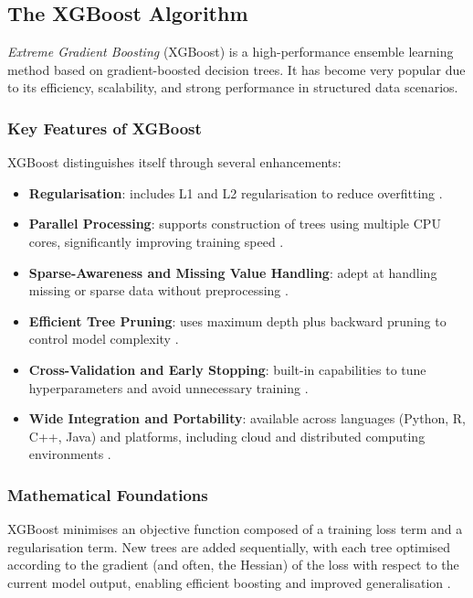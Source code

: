\subsection{The XGBoost Algorithm}

\emph{Extreme Gradient Boosting} (XGBoost) is a high-performance ensemble learning method based on gradient-boosted decision trees. It has become very popular due to its efficiency, scalability, and strong performance in structured data scenarios.

\subsubsection{Key Features of XGBoost}

XGBoost distinguishes itself through several enhancements:

\begin{itemize}
  \item \textbf{Regularisation}: includes L1 and L2 regularisation to reduce overfitting \parencite{turn0search0}.
  \item \textbf{Parallel Processing}: supports construction of trees using multiple CPU cores, significantly improving training speed \parencite{turn0search0}.
  \item \textbf{Sparse-Awareness and Missing Value Handling}: adept at handling missing or sparse data without preprocessing \parencite{turn0search0}.
  \item \textbf{Efficient Tree Pruning}: uses maximum depth plus backward pruning to control model complexity \parencite{turn0search0}.
  \item \textbf{Cross-Validation and Early Stopping}: built-in capabilities to tune hyperparameters and avoid unnecessary training \parencite{turn0search0}.
  \item \textbf{Wide Integration and Portability}: available across languages (Python, R, C++, Java) and platforms, including cloud and distributed computing environments \parencite{turn0search0}.
\end{itemize}

\subsubsection{Mathematical Foundations}

XGBoost minimises an objective function composed of a training loss term and a regularisation term. New trees are added sequentially, with each tree optimised according to the gradient (and often, the Hessian) of the loss with respect to the current model output, enabling efficient boosting and improved generalisation \parencite{turn0search0}.

